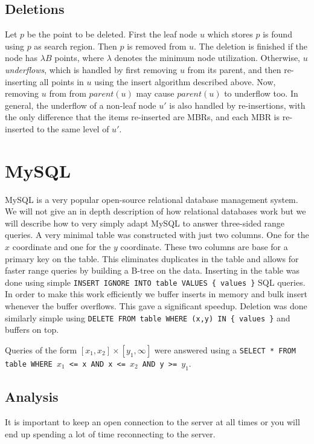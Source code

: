 \documentclass[twoside,11pt,openright]{report}
\begin{document}
\subsection{Deletions}
Let $p$ be the point to be deleted. First the leaf node $u$ which stores $p$ is found using $p$ as search region. Then $p$ is removed from $u$. The deletion is finished if the node has $\lambda B$ points, where $\lambda$ denotes the minimum node utilization. Otherwise, $u$ \textit{underflows}, which is handled by first removing $u$ from its parent, and then re-inserting all points in $u$ using the insert algorithm described above. Now, removing $u$ from from $parent(u)$ may cause $parent(u)$ to underflow too. In general, the underflow of a non-leaf node $u'$ is also handled by re-insertions, with the only difference that the items re-inserted are MBRs, and each MBR is re-inserted to the same level of $u'$.

\section{MySQL}
\label{sec:mysql}
MySQL is a very popular open-source relational database management system. We will not give an in depth description of how relational databases work but we will describe how to very simply adapt MySQL to answer three-sided range queries. A very minimal table was constructed with just two columns. One for the $x$ coordinate and one for the $y$ coordinate. These two columns are base for a primary key on the table. This eliminates duplicates in the table and allows for faster range queries by building a B-tree on the data. Inserting in the table was done using simple \texttt{INSERT IGNORE INTO table VALUES \{ values \}} SQL queries. In order to make this work efficiently we buffer inserts in memory and bulk insert whenever the buffer overflows. This gave a significant speedup. Deletion was done similarly simple using \texttt{DELETE FROM table WHERE (x,y) IN \{ values \}} and buffers on top.

Queries of the form $\left[x_1,x_2\right] \times \left[y_1,\infty\right]$ were answered using a \texttt{SELECT * FROM table WHERE $x_1$ <= x AND x <= $x_2$ AND y >= $y_1$}.

\subsection{Analysis}
It is important to keep an open connection to the server at all times or you will end up spending a lot of time reconnecting to the server.
\end{document}
